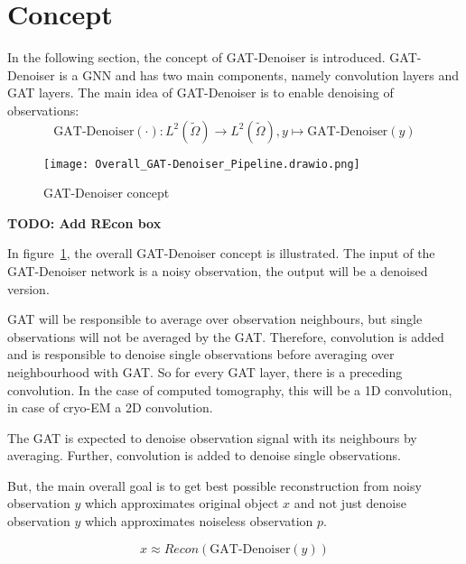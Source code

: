 \section{Concept}


In the following section, the concept of GAT-Denoiser is introduced. 
GAT-Denoiser is a GNN and has two main components, namely convolution layers and GAT layers.
The main idea of GAT-Denoiser is to enable denoising of observations:
\begin{equation}
  \text{GAT-Denoiser} (\cdot) : L^2(\tilde{\Omega}) \to  L^2(\tilde{\Omega}) , y \mapsto \text{GAT-Denoiser} (y) 
\end{equation}


\begin{figure}[H]
  \centering
  \label{fig:overall-concept}
  \texttt{[image: Overall\_GAT-Denoiser\_Pipeline.drawio.png]}
  \caption{GAT-Denoiser concept}
\end{figure}

\textbf{TODO: Add REcon box}

In figure~\ref{fig:overall-concept}, the overall GAT-Denoiser concept is illustrated.
The input of the GAT-Denoiser network is a noisy observation, the output will be a denoised version.

GAT will be responsible to average over observation neighbours, but single observations will
not be averaged by the GAT. 
Therefore, convolution is added and is responsible to denoise single observations
before averaging over neighbourhood with GAT. So for every GAT layer, there is a preceding convolution. 
In the case of computed tomography, this will be a 1D convolution, in case of cryo-EM a 2D convolution.

\begin{tcolorbox}[colback=red!5!white,colframe=red!75!black]
  The GAT is expected to denoise observation signal with its neighbours by averaging. 
  Further, convolution is added to denoise single observations.
\end{tcolorbox}


But, the main overall goal is to get best possible reconstruction 
from noisy observation $y$ which approximates original object $x$ and 
not just denoise observation $y$ which approximates noiseless observation $p$.


\begin{equation}
  x \approx   Recon \left( \text{GAT-Denoiser} \left( y \right) \right)
\end{equation}

